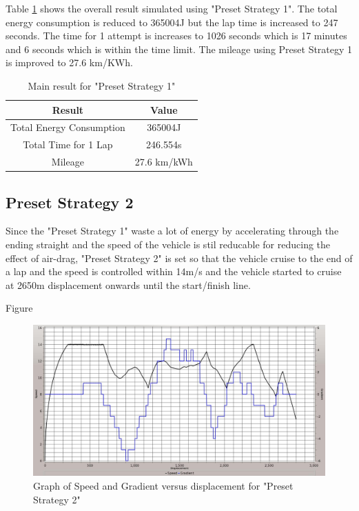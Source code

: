 Table \ref{tb:preset1Result} shows the overall result simulated using "Preset Strategy 1". The total energy consumption is reduced to 365004J but the lap time is increased to 247 seconds. The time for 1 attempt is increases to 1026 seconds which is 17 minutes and 6 seconds which is within the time limit. The mileage using Preset Strategy 1 is improved to 27.6 km/KWh.

\begin{table}[htbp]
\begin{center}
\begin{tabular}{|c|c|}
\hline
\textbf{Result} & \textbf{Value} \\ \hline
Total Energy Consumption & 365004J \\ \hline
Total Time for 1 Lap & 246.554s \\ \hline
Mileage & 27.6 km/kWh \\ \hline
\end{tabular}
\end{center}
\caption{Main result for "Preset Strategy 1" }
\label{tb:preset1Result}
\end{table} \clearpage

\subsection{Preset Strategy 2}
Since the "Preset Strategy 1" waste a lot of energy by accelerating through the ending straight and the speed of the vehicle is stil reducable for reducing the effect of air-drag, "Preset Strategy 2" is set so that the vehicle cruise to the end of a lap and the speed is controlled within 14m/s and the vehicle started to cruise at 2650m displacement onwards until the start/finish line.

Figure 

\begin{figure}[htb]
	\centering
	\includegraphics[width=6in]{images/2_1.jpg}
	\caption{Graph of Speed and Gradient versus displacement for "Preset Strategy 2"}
	\label{im:2_1}
\end{figure}

